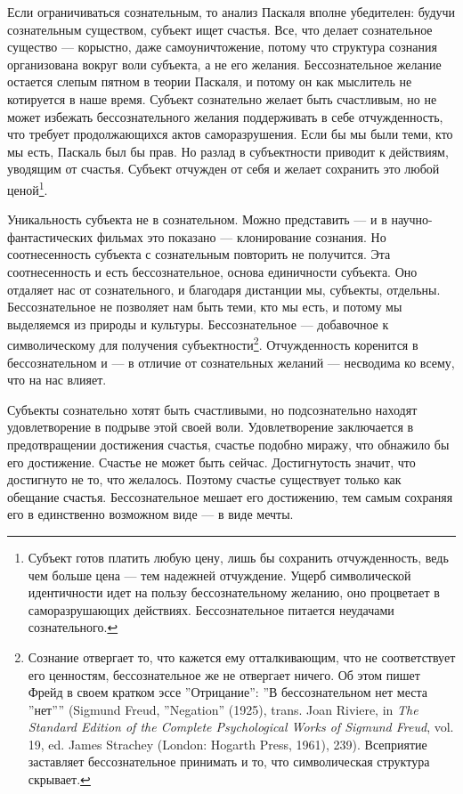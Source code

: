 \documentclass[12pt]{book}
\begin{document}
Если ограничиваться сознательным, то анализ Паскаля вполне убедителен: будучи сознательным существом, субъект ищет счастья. Все, что делает сознательное существо --- корыстно, даже самоуничтожение, потому что структура сознания организована вокруг воли субъекта, а не его желания. Бессознательное желание остается слепым пятном в теории Паскаля, и потому он как мыслитель не котируется в наше время. Субъект сознательно желает быть счастливым, но не может избежать бессознательного желания поддерживать в себе отчужденность, что требует продолжающихся актов саморазрушения. Если бы мы были теми, кто мы есть, Паскаль был бы прав. Но разлад в субъектности приводит к действиям, уводящим от счастья. Субъект отчужден от себя и желает сохранить это любой ценой\footnote{Субъект готов платить любую цену, лишь бы сохранить отчужденность, ведь чем больше цена --- тем надежней отчуждение. Ущерб символической идентичности идет на пользу бессознательному желанию, оно процветает в саморазрушающих действиях. Бессознательное питается неудачами сознательного.}.

Уникальность субъекта не в сознательном. Можно представить --- и в научно-фантастических фильмах это показано --- клонирование сознания. Но соотнесенность субъекта с сознательным повторить не получится. Эта соотнесенность и есть бессознательное, основа единичности субъекта. Оно отдаляет нас от сознательного, и благодаря дистанции мы, субъекты, отдельны. Бессознательное не позволяет нам быть теми, кто мы есть, и потому мы выделяемся из природы и культуры. Бессознательное --- добавочное к символическому для получения субъектности\footnote{Сознание отвергает то, что кажется ему отталкивающим, что не соответствует его ценностям, бессознательное же не отвергает ничего. Об этом пишет Фрейд в своем кратком эссе ''Отрицание'': ''В бессознательном нет места ''нет'''' (Sigmund Freud,
''Negation'' (1925), trans. Joan Riviere, in \textit{The Standard Edition of the Complete Psychological Works of Sigmund Freud}, vol. 19, ed. James Strachey (London: Hogarth Press, 1961), 239). Всеприятие заставляет бессознательное принимать и то, что символическая структура скрывает.}. Отчужденность коренится в бессознательном и --- в отличие от сознательных желаний --- несводима ко всему, что на нас влияет.

Субъекты сознательно хотят быть счастливыми, но подсознательно находят удовлетворение в подрыве этой своей воли. Удовлетворение заключается в предотвращении достижения счастья, счастье подобно миражу, что обнажило бы его достижение. Счастье не может быть сейчас. Достигнутость значит, что достигнуто не то, что желалось. Поэтому счастье существует только как обещание счастья. Бессознательное мешает его достижению, тем самым сохраняя его в единственно возможном виде --- в виде мечты.
\end{document}
